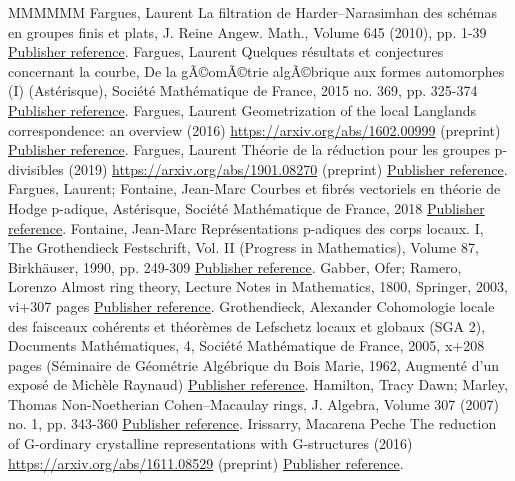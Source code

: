 \begin{thebibliography}{MMMMMM}
 Fargues, Laurent La filtration de Harder–Narasimhan des schémas en groupes finis et plats, J. Reine Angew. Math., Volume 645 (2010), pp. 1-39 \href{https://ahl.centre-mersenne.org/item/AHL_2019__2__415_0/#Fa10}{Publisher reference}.
 Fargues, Laurent Quelques résultats et conjectures concernant la courbe, De la gÃ©omÃ©trie algÃ©brique aux formes automorphes (I) (Astérisque), Société Mathématique de France, 2015 no. 369, pp. 325-374 \href{https://ahl.centre-mersenne.org/item/AHL_2019__2__415_0/#Fa15}{Publisher reference}.
 Fargues, Laurent Geometrization of the local Langlands correspondence: an overview (2016) \url{https://arxiv.org/abs/1602.00999} (preprint) \href{https://ahl.centre-mersenne.org/item/AHL_2019__2__415_0/#Fa16}{Publisher reference}.
 Fargues, Laurent Théorie de la réduction pour les groupes p-divisibles (2019) \url{https://arxiv.org/abs/1901.08270} (preprint) \href{https://ahl.centre-mersenne.org/item/AHL_2019__2__415_0/#Fa12}{Publisher reference}.
 Fargues, Laurent; Fontaine, Jean-Marc Courbes et fibrés vectoriels en théorie de Hodge p-adique, Astérisque, Société Mathématique de France, 2018 \href{https://ahl.centre-mersenne.org/item/AHL_2019__2__415_0/#FaFo15}{Publisher reference}.
 Fontaine, Jean-Marc Représentations p-adiques des corps locaux. I, The Grothendieck Festschrift, Vol. II (Progress in Mathematics), Volume 87, Birkhäuser, 1990, pp. 249-309 \href{https://ahl.centre-mersenne.org/item/AHL_2019__2__415_0/#Fo90}{Publisher reference}.
 Gabber, Ofer; Ramero, Lorenzo Almost ring theory, Lecture Notes in Mathematics, 1800, Springer, 2003, vi+307 pages \href{https://ahl.centre-mersenne.org/item/AHL_2019__2__415_0/#GaRa03}{Publisher reference}.
 Grothendieck, Alexander Cohomologie locale des faisceaux cohérents et théorèmes de Lefschetz locaux et globaux (SGA 2), Documents Mathématiques, 4, Société Mathématique de France, 2005, x+208 pages (Séminaire de Géométrie Algébrique du Bois Marie, 1962, Augmenté d’un exposé de Michèle Raynaud) \href{https://ahl.centre-mersenne.org/item/AHL_2019__2__415_0/#SGA2r}{Publisher reference}.
 Hamilton, Tracy Dawn; Marley, Thomas Non-Noetherian Cohen–Macaulay rings, J. Algebra, Volume 307 (2007) no. 1, pp. 343-360 \href{https://ahl.centre-mersenne.org/item/AHL_2019__2__415_0/#HaMa07}{Publisher reference}.
 Irissarry, Macarena Peche The reduction of G-ordinary crystalline representations with G-structures (2016) \url{https://arxiv.org/abs/1611.08529} (preprint) \href{https://ahl.centre-mersenne.org/item/AHL_2019__2__415_0/#Imp16}{Publisher reference}.

\end{thebibliography}
